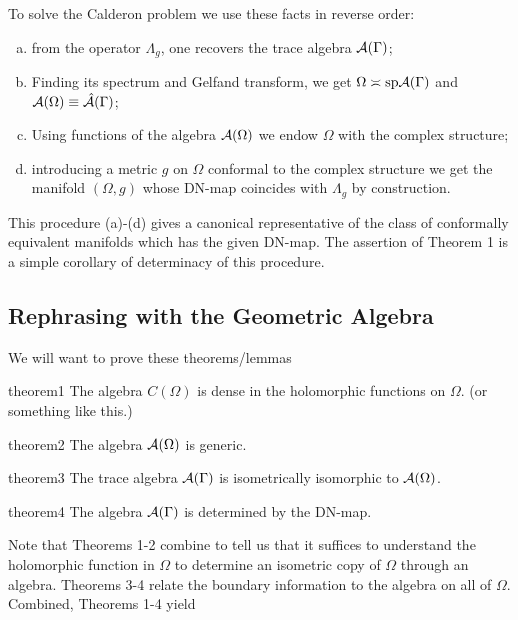 To solve the Calderon problem we use these facts in reverse order:
\begin{enumerate}[(a)]
	\item from the operator $\Lambda_g$, one recovers the trace algebra $\mathcal{A}(\Gamma)$;
	\item Finding its spectrum and Gelfand transform, we get $\Omega \asymp \mathrm{sp} \mathcal{A}(\Gamma)$ and $\mathcal{A}(\Omega)\equiv \hat{\mathcal{A}}(\Gamma)$;
	\item Using functions of the algebra $\mathcal{A}(\Omega)$ we endow $\Omega$ with the complex structure;
	\item introducing a metric $g$ on $\Omega$ conformal to the complex structure we get the manifold $(\Omega,g)$ whose DN-map coincides with $\Lambda_g$ by construction.
\end{enumerate}
This procedure (a)-(d) gives a canonical representative of the class of conformally equivalent manifolds which has the given DN-map. The assertion of Theorem 1 is a simple corollary of determinacy of this procedure.

\subsection{Rephrasing with the Geometric Algebra}

We will want to prove these theorems/lemmas

\begin{thm}{}{theorem1}
	The algebra $C(\Omega)$ is dense in the holomorphic functions on $\Omega$. (or something like this.)
\end{thm}

\begin{thm}{}{theorem2}
	The algebra $\mathcal{A}(\Omega)$ is generic.
\end{thm}

\begin{thm}{}{theorem3}
	The trace algebra $\mathcal{A}(\Gamma)$ is isometrically isomorphic to $\mathcal{A}(\Omega)$.
\end{thm}

\begin{thm}{}{theorem4}
	The algebra $\mathcal{A}(\Gamma)$ is determined by the DN-map.
\end{thm}

Note that Theorems 1-2 combine to tell us that it suffices to understand the holomorphic function in $\Omega$ to determine an isometric copy of $\Omega$ through an algebra.  Theorems 3-4 relate the boundary information to the algebra on all of $\Omega$. Combined, Theorems 1-4 yield

